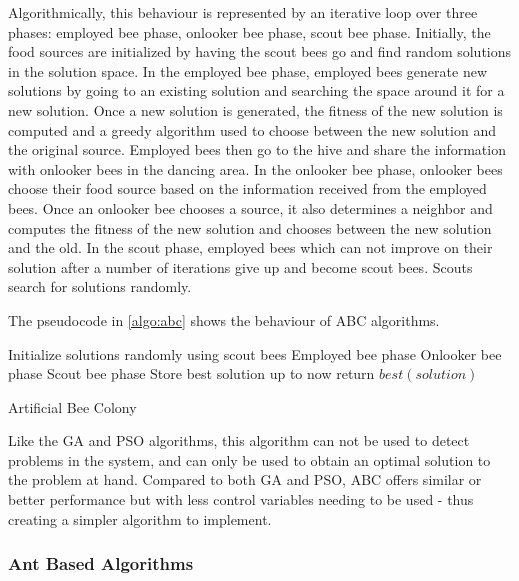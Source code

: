 Algorithmically, this behaviour is represented by an iterative loop over three phases: employed bee phase, onlooker bee phase, scout bee phase. Initially, the food sources are initialized by having the scout bees go and find random solutions in the solution space. In the employed bee phase, employed bees generate new solutions by going to an existing solution and searching the space around it for a new solution. Once a new solution is generated, the fitness of the new solution is computed and a greedy algorithm used to choose between the new solution and the original source. Employed bees then go to the hive and share the information with onlooker bees in the dancing area. In the onlooker bee phase, onlooker bees choose their food source based on the information received from the employed bees. Once an onlooker bee chooses a source, it also determines a neighbor and computes the fitness of the new solution and chooses between the new solution and the old. In the scout phase, employed bees which can not improve on their solution after a number of iterations give up and become scout bees. Scouts search for solutions randomly.

The pseudocode in \ref{algo:abc} shows the behaviour of ABC algorithms.

\begin{algorithm}
\begin{algorithmic}
\State Initialize solutions randomly using scout bees
	\State Employed bee phase
	\State Onlooker bee phase
	\State Scout bee phase
	\State Store best solution up to now
\EndWhile
\State return $best(solution)$
\end{algorithmic}
\caption{Artificial Bee Colony}\label{algo:abc}
\end{algorithm}

Like the GA and PSO algorithms, this algorithm can not be used to detect problems in the system, and can only be used to obtain an optimal solution to the problem at hand. Compared to both GA and PSO, ABC offers similar or better performance but with less control variables needing to be used - thus creating a simpler algorithm to implement.

\subsubsection{Ant Based Algorithms}


